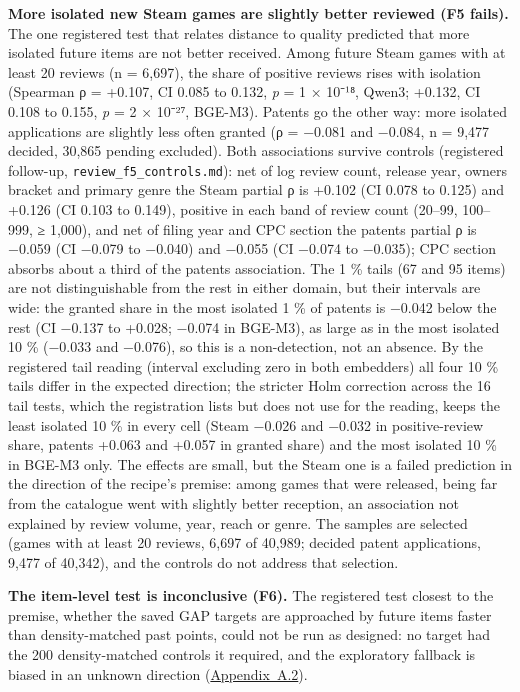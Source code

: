 \documentclass[
  10pt,
]{article}
\begin{document}
\textbf{More isolated new Steam games
are slightly better reviewed (F5
fails).} The one registered test that
relates distance to quality predicted
that more isolated future items are not
better received. Among future Steam
games with at least 20 reviews (n =
6,697), the share of positive reviews
rises with isolation (Spearman ρ =
+0.107, CI 0.085 to 0.132, \emph{p} = 1
× 10⁻¹⁸, Qwen3; +0.132, CI 0.108 to
0.155, \emph{p} = 2 × 10⁻²⁷, BGE-M3).
Patents go the other way: more isolated
applications are slightly less often
granted (ρ = −0.081 and −0.084, n =
9,477 decided, 30,865 pending excluded).
Both associations survive controls
(registered follow-up,
\texttt{review\_\allowbreak{}f5\_\allowbreak{}controls.md}):
net of log review count, release year,
owners bracket and primary genre the
Steam partial ρ is +0.102 (CI 0.078 to
0.125) and +0.126 (CI 0.103 to 0.149),
positive in each band of review count
(20--99, 100--999, ≥ 1,000), and net of
filing year and CPC section the patents
partial ρ is −0.059 (CI −0.079 to
−0.040) and −0.055 (CI −0.074 to
−0.035); CPC section absorbs about a
third of the patents association. The 1
\% tails (67 and 95 items) are not
distinguishable from the rest in either
domain, but their intervals are wide:
the granted share in the most isolated 1
\% of patents is −0.042 below the rest
(CI −0.137 to +0.028; −0.074 in BGE-M3),
as large as in the most isolated 10 \%
(−0.033 and −0.076), so this is a
non-detection, not an absence. By the
registered tail reading (interval
excluding zero in both embedders) all
four 10 \% tails differ in the expected
direction; the stricter Holm correction
across the 16 tail tests, which the
registration lists but does not use for
the reading, keeps the least isolated 10
\% in every cell (Steam −0.026 and
−0.032 in positive-review share, patents
+0.063 and +0.057 in granted share) and
the most isolated 10 \% in BGE-M3 only.
The effects are small, but the Steam one
is a failed prediction in the direction
of the recipe's premise: among games
that were released, being far from the
catalogue went with slightly better
reception, an association not explained
by review volume, year, reach or genre.
The samples are selected (games with at
least 20 reviews, 6,697 of 40,989;
decided patent applications, 9,477 of
40,342), and the controls do not address
that selection.

\textbf{The item-level test is
inconclusive (F6).} The registered test
closest to the premise, whether the
saved GAP targets are approached by
future items faster than density-matched
past points, could not be run as
designed: no target had the 200
density-matched controls it required,
and the exploratory fallback is biased
in an unknown direction
(\hyperref[app:A.2]{Appendix~A.2}).
\end{document}
